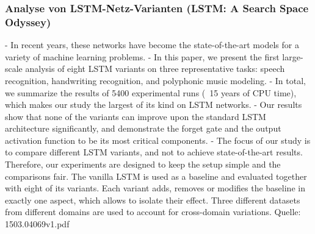 {\subsubsection{Analyse von LSTM-Netz-Varianten (LSTM: A Search Space Odyssey)}
- In recent years, these networks have become the state-of-the-art models for a variety of machine learning problems.
- In this paper, we present the first large-scale analysis of eight LSTM variants on three representative tasks: speech recognition, handwriting recognition, and polyphonic music modeling.
- In total, we summarize the results of 5400 experimental runs (~15 years of CPU time), which makes our study the largest of its kind on LSTM networks.
- Our results show that none of the variants can improve upon the standard LSTM architecture significantly, and demonstrate the forget gate and the output activation function to be its most critical components.
- The focus of our study is to compare different LSTM variants, and not to achieve state-of-the-art results. Therefore, our experiments are designed to keep the setup simple and the comparisons fair. The vanilla LSTM is used as a baseline and evaluated together with eight of its variants. Each variant adds, removes or modifies the baseline in exactly one aspect, which allows to isolate their effect. Three different datasets from different domains are used to account for cross-domain variations.
Quelle: 1503.04069v1.pdf

}

